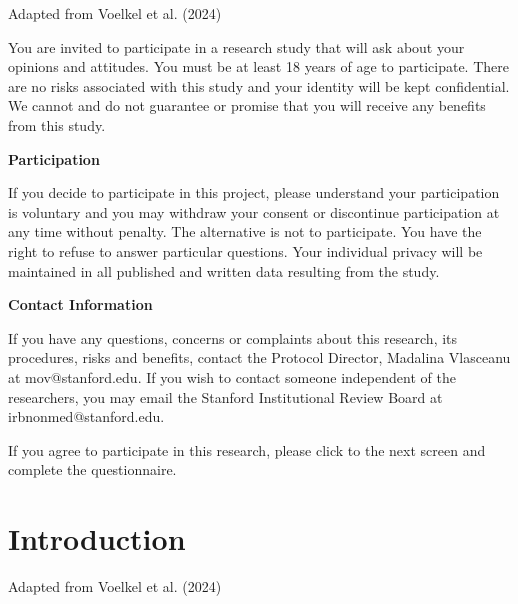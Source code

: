 \documentclass[
  letterpaper,
  DIV=11,
  numbers=noendperiod]{scrartcl}
\begin{document}
\begin{tcolorbox}[enhanced jigsaw, toprule=.15mm, toptitle=1mm, colframe=quarto-callout-note-color-frame, leftrule=.75mm, rightrule=.15mm, bottomtitle=1mm, coltitle=black, colbacktitle=quarto-callout-note-color!10!white, bottomrule=.15mm, breakable, opacityback=0, titlerule=0mm, title=\textcolor{quarto-callout-note-color}{\faInfo}\hspace{0.5em}{Note}, left=2mm, arc=.35mm, opacitybacktitle=0.6, colback=white]

Adapted from Voelkel et al. (2024)

\end{tcolorbox}

You are invited to participate in a research study that will ask about
your opinions and attitudes. You must be at least 18 years of age to
participate. There are no risks associated with this study and your
identity will be kept confidential. We cannot and do not guarantee or
promise that you will receive any benefits from this study.

\textbf{Participation}

If you decide to participate in this project, please understand your
participation is voluntary and you may withdraw your consent or
discontinue participation at any time without penalty. The alternative
is not to participate. You have the right to refuse to answer particular
questions. Your individual privacy will be maintained in all published
and written data resulting from the study.

\textbf{Contact Information}

If you have any questions, concerns or complaints about this research,
its procedures, risks and benefits, contact the Protocol Director,
Madalina Vlasceanu at mov@stanford.edu. If you wish to contact someone
independent of the researchers, you may email the Stanford Institutional
Review Board at irbnonmed@stanford.edu.

If you agree to participate in this research, please click to the next
screen and complete the questionnaire.

\section{Introduction}\label{introduction}

\begin{tcolorbox}[enhanced jigsaw, toprule=.15mm, toptitle=1mm, colframe=quarto-callout-note-color-frame, leftrule=.75mm, rightrule=.15mm, bottomtitle=1mm, coltitle=black, colbacktitle=quarto-callout-note-color!10!white, bottomrule=.15mm, breakable, opacityback=0, titlerule=0mm, title=\textcolor{quarto-callout-note-color}{\faInfo}\hspace{0.5em}{Note}, left=2mm, arc=.35mm, opacitybacktitle=0.6, colback=white]

Adapted from Voelkel et al. (2024)

\end{tcolorbox}
\end{document}
